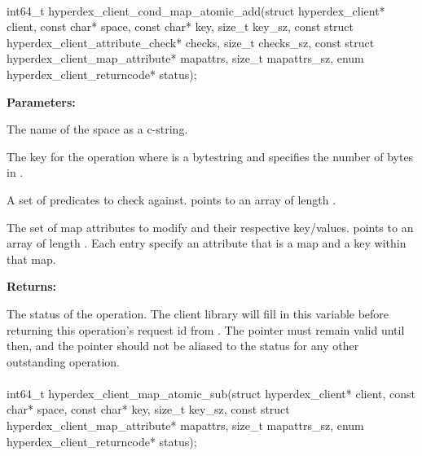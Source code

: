 \paragraph{}
\label{api:c:cond_map_atomic_add}
\begin{ccode}
int64_t hyperdex_client_cond_map_atomic_add(struct hyperdex_client* client,
                const char* space,
                const char* key, size_t key_sz,
                const struct hyperdex_client_attribute_check* checks, size_t checks_sz,
                const struct hyperdex_client_map_attribute* mapattrs, size_t mapattrs_sz,
                enum hyperdex_client_returncode* status);
\end{ccode}
\funcdesc 

\noindent\textbf{Parameters:}
\begin{description}[labelindent=\widthof{{\code{mapattrs}, \code{mapattrs\_sz}}},leftmargin=*,noitemsep,nolistsep,align=right]
\item[\code{space}] The name of the space as a c-string.
\item[\code{key}, \code{key\_sz}] The key for the operation where  is a bytestring and  specifies the number of bytes in .
\item[\code{checks}, \code{checks\_sz}] A set of predicates to check against.   points to an array of length .
\item[\code{mapattrs}, \code{mapattrs\_sz}] The set of map attributes to modify and their respective key/values.   points to an array of length .  Each entry specify an attribute that is a map and a key within that map.
\end{description}

\noindent\textbf{Returns:}
\begin{description}[labelindent=\widthof{{\code{status}}},leftmargin=*,noitemsep,nolistsep,align=right]
\item[\code{status}] The status of the operation.  The client library will fill in this variable before returning this operation's request id from .  The pointer must remain valid until then, and the pointer should not be aliased to the status for any other outstanding operation.
\end{description}

\paragraph{}
\label{api:c:map_atomic_sub}
\begin{ccode}
int64_t hyperdex_client_map_atomic_sub(struct hyperdex_client* client,
                const char* space,
                const char* key, size_t key_sz,
                const struct hyperdex_client_map_attribute* mapattrs, size_t mapattrs_sz,
                enum hyperdex_client_returncode* status);
\end{ccode}
\funcdesc 

